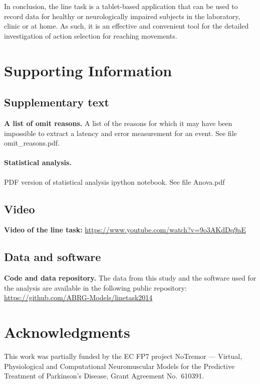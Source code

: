 \documentclass[10pt,letterpaper]{article}
\begin{document}
In conclusion, the line task is a tablet-based application that can be
used to record data for healthy or neurologically impaired subjects in
the laboratory, clinic or at home. As such, it is an effective and
convenient tool for the detailed investigation of action selection for
reaching movements.

\section*{Supporting Information}

\subsection*{Supplementary text}

\label{linetask_omitreasons}
{\bf A list of omit reasons.} A list of the reasons for which it may
have been impossible to extract a latency and error measurement for an
event. See file omit\_reasons.pdf.

\label{linetask_anova}
\paragraph{Statistical analysis.} PDF version of statistical analysis
ipython notebook. See file Anova.pdf

\subsection*{Video}

\label{linetaskvid}
{\bf Video of the line task:} \url{https://www.youtube.com/watch?v=9o3AKdDq9aE}

\subsection*{Data and software}

\label{linetaskrepo}
{\bf Code and data repository.} The data from this study and the
software used for the analysis are available in the following public
repository: \url{https://github.com/ABRG-Models/linetask2014}

\section*{Acknowledgments}

This work was partially funded by the EC FP7 project NoTremor ---
Virtual, Physiological and Computational Neuromuscular Models for the
Predictive Treatment of Parkinson's Disease, Grant Agreement
No.~610391.
\end{document}
